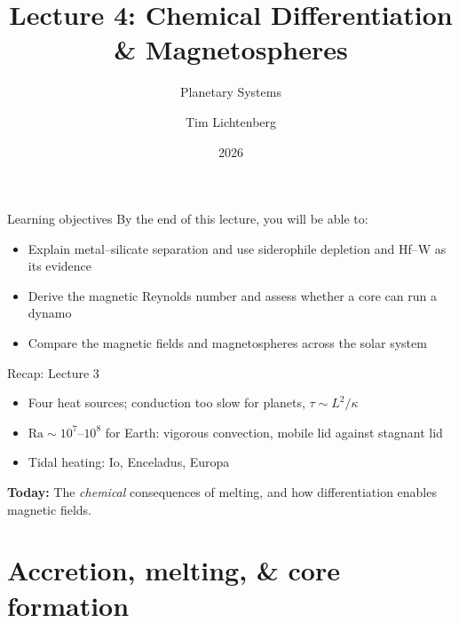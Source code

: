 \documentclass[aspectratio=169, 11pt]{beamer}
\title[Lecture 4: Differentiation \& Magnetospheres]{Lecture 4: Chemical Differentiation\\\& Magnetospheres}
\subtitle{Planetary Systems}
\author[L4]{Tim Lichtenberg}
\institute{Kapteyn Astronomical Institute\\University of Groningen}
\date{2026}
\begin{document}
\begin{frame}
  \titlepage
\end{frame}

\begin{frame}{Learning objectives}
  By the end of this lecture, you will be able to:
  \vskip8pt
  \begin{itemize}
    \item Explain metal--silicate separation and use siderophile depletion and Hf--W as its evidence
    \item Derive the magnetic Reynolds number and assess whether a core can run a dynamo
    \item Compare the magnetic fields and magnetospheres across the solar system
  \end{itemize}
\end{frame}

\begin{frame}{Recap: Lecture 3}
  \begin{itemize}
    \item Four heat sources; conduction too slow for planets, $\tau \sim L^2/\kappa$
    \item $\mathrm{Ra} \sim 10^7$--$10^8$ for Earth: vigorous convection, mobile lid against stagnant lid
    \item Tidal heating: Io, Enceladus, Europa
  \end{itemize}
  \vskip8pt
  \textbf{Today:} The \textit{chemical} consequences of melting, and how differentiation enables magnetic fields.
\end{frame}

\section{Accretion, melting, \& core formation}

\begin{frame}
\end{frame}
\end{document}
